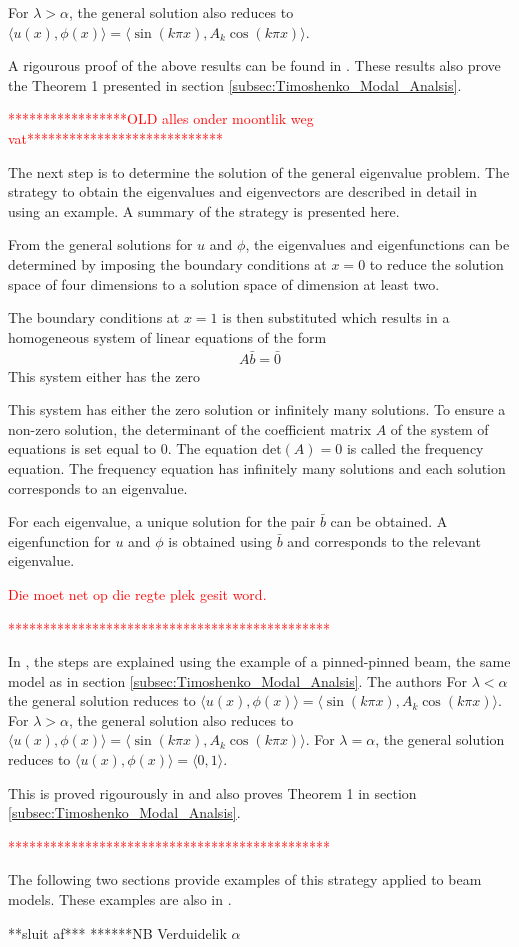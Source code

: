 \documentclass[../../main.tex]{subfiles}
\begin{document}
For $\lambda > \alpha$, the general solution also reduces to $\langle u(x) , \phi(x) \rangle = \langle \sin(k \pi x), A_k  \cos(k \pi x) \rangle$. 


A rigourous proof of the above results can be found in \cite{VV06}. These results also prove the Theorem 1 presented in section \ref{subsec:Timoshenko_Modal_Analsis}.



\textcolor{red}{*****************OLD alles onder moontlik weg vat****************************}

The next step is to determine the solution of the general eigenvalue problem. The strategy to obtain the eigenvalues and eigenvectors are described in detail in \cite{VV06} using an example. A summary of the strategy is presented here.

From the general solutions for $u$ and $\phi$, the eigenvalues and eigenfunctions can be determined by imposing the boundary conditions at $x=0$ to reduce the solution space of four dimensions to a solution space of dimension at least two. 

The boundary conditions at $x=1$ is then substituted which results in a homogeneous system of linear equations of the form
\begin{eqnarray*}
A \bar{b} = \bar{0}
\end{eqnarray*}
This system either has the zero


 This system has either the zero solution or infinitely many solutions. To ensure a non-zero solution, the determinant of the coefficient matrix $A$ of the system of equations is set equal to 0. The equation $\textrm{det}(A) = 0$ is called the frequency equation. The frequency equation has infinitely many solutions and each solution corresponds to an eigenvalue.
 
 For each eigenvalue, a unique solution for the pair $\bar{b}$ can be obtained. A eigenfunction for $u$ and $\phi$ is obtained using $\bar{b}$ and corresponds to the relevant eigenvalue.

\textcolor{red}{Die moet net op die regte plek gesit word.}


\textcolor{red}{**********************************************}

In \cite{VV06}, the steps are explained using the example of a pinned-pinned beam, the same model as in section \ref{subsec:Timoshenko_Modal_Analsis}. The authors  For $\lambda < \alpha$ the general solution reduces to $\langle u(x) , \phi(x) \rangle = \langle \sin(k \pi x), A_k \cos(k \pi x) \rangle$. For $\lambda > \alpha$, the general solution also reduces to $\langle u(x) , \phi(x) \rangle = \langle \sin(k \pi x), A_k  \cos(k \pi x) \rangle$. For $\lambda = \alpha$, the general solution reduces to $\langle u(x) , \phi(x) \rangle = \langle 0, 1 \rangle$.

This is proved rigourously in \cite{VV06} and also proves Theorem 1 in section \ref{subsec:Timoshenko_Modal_Analsis}.

\textcolor{red}{**********************************************}

The following two sections provide examples of this strategy applied to beam models. These examples are also in \cite{VV06}.

**sluit af***
******NB Verduidelik $\alpha$
\end{document}
